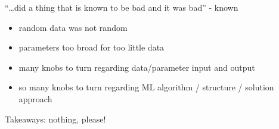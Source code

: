 \documentclass{beamer}
\newcommand{\mybox}[3]{{\color{#1}\framebox{\color{#2}#3}}}
\begin{document}
    \begin{frame}{\mybox{green}{blue}{Summary}}
        ``\ldots did a thing that is known to be bad and it was bad'' - known
        \vspace{0.5cm}
        \begin{itemize}
            \item random data was not random
            \item parameters too broad for too little data
            \item many knobs to turn regarding data/parameter input and output
            \item so many knobs to turn regarding ML algorithm / structure / solution approach
        \end{itemize}
        \vspace{0.5cm}
        Takeaways: nothing, please!
    \end{frame}


\end{document}
